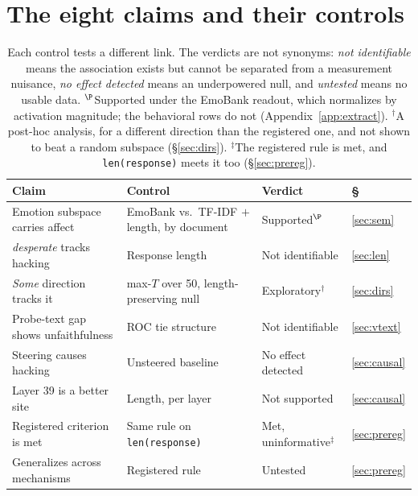 \documentclass{article}
\begin{document}
\section{The eight claims and their controls}
\begin{table}[!ht]
\centering\scriptsize\setlength{\tabcolsep}{4pt}
\begin{tabular}{@{}llll@{}}
\toprule
\textbf{Claim} & \textbf{Control} & \textbf{Verdict} & \textbf{\S} \\
\midrule
Emotion subspace carries affect & EmoBank vs.\ TF-IDF $+$ length, by document & Supported$^{\P}$ &
\ref{sec:sem} \\
\emph{desperate} tracks hacking & Response length & Not identifiable &
\ref{sec:len} \\
\emph{Some} direction tracks it & max-$T$ over 50, length-preserving null & Exploratory$^\dagger$ & \ref{sec:dirs} \\
Probe-text gap shows unfaithfulness & ROC tie structure & Not identifiable &
\ref{sec:vtext} \\
Steering causes hacking & Unsteered baseline & No effect detected &
\ref{sec:causal} \\
Layer 39 is a better site & Length, per layer & Not supported &
\ref{sec:causal} \\
Registered criterion is met & Same rule on \texttt{len(response)} & Met, uninformative$^\ddagger$ &
\ref{sec:prereg} \\
Generalizes across mechanisms & Registered rule & Untested & \ref{sec:prereg} \\
\bottomrule
\end{tabular}
\caption{Each control tests a different link. The verdicts are not synonyms:
\emph{not identifiable} means the association exists but cannot be separated from a
measurement nuisance, \emph{no effect detected} means an underpowered null, and
\emph{untested} means no usable data. $^{\P}$Supported under the EmoBank readout, which
normalizes by activation magnitude; the behavioral rows do not
(Appendix~\ref{app:extract}). $^\dagger$A post-hoc analysis, for a different direction than the registered
one, and not shown to beat a random subspace (\S\ref{sec:dirs}). $^\ddagger$The registered rule is met,
and \texttt{len(response)} meets it too (\S\ref{sec:prereg}).}
\label{tab:summary}
\end{table}







\end{document}
